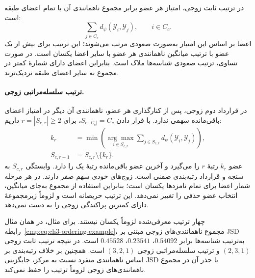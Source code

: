 در ترتیب ثابت زوجی، امتیاز هر عضو برابر مجموع
ناهمانندی آن با تمام اعضای طبقه است:
\begin{equation}\label{cmp:eq:ch3-pairwise-fixed-order}
\sum_{j\in C_c}d_\psi(\mathscr Y_i,\mathscr Y_j),
\qquad i\in C_c.
\end{equation}
اعضا بر اساس این امتیاز به‌صورت صعودی مرتب
می‌شوند؛ این ترتیب برای بیش از یک عضو با ترتیب
میانگین ناهمانندی هر عضو با سایر اعضا یکسان است.
در صورت تساوی، ترتیب صعودی شناسه‌ها ملاک است. بنابراین اعضای دارای شمارهٔ کمتر
در مجموع به سایر اعضای طبقه نزدیک‌ترند.

\paragraph{ترتیب سلسله‌مراتبی زوجی.}
در قرارداد دوم زوجی، پس از کنارگذاری هر عضو،
ناهمانندی آن دیگر در امتیاز اعضای باقی‌مانده
سهمی ندارد. با قرار دادن $S_{c,|C_c|}=C_c$،
برای $r=|S_{c,r}|\ge2$ داریم:
\begin{equation}\label{cmp:eq:ch3-pairwise-recursive-order}
\begin{aligned}
k_r&=\min\left(\underset{i\in S_{c,r}}{\arg\max}
\sum_{j\in S_{c,r}}d_\psi(\mathscr Y_i,\mathscr Y_j)\right),\\
S_{c,r-1}&=S_{c,r}\setminus\{k_r\}.
\end{aligned}
\end{equation}
عضو $k_r$ رتبهٔ $r$ را می‌گیرد و آخرین عضو
باقی‌مانده رتبهٔ یک را دارد. وابستگی $S_{c,r}$
به سنجه و قرارداد رتبه‌بندی ضمنی است. زوج‌های
خودی سهم صفر دارند. در هر مرحله شمار اعضا برای تمام
نامزدها یکسان است؛ بنابراین استفاده از مجموع
به‌جای میانگین، انتخاب عضو حذفی را تغییر نمی‌دهد.
این ترتیب حریصانه است و لزوماً زیرمجموعهٔ دارای
کمترین پراکندگی زوجی را به دست نمی‌دهد.

چهار ترتیب معرفی‌شده لزوماً یکسان نیستند.
برای مثال، در همان مثال
رابطه~\eqref{cmp:eq:ch3-ordering-example}،
مجموع ناهمانندی‌های زوجی مبتنی بر JSD به‌ترتیب
شناسه‌ها برابر $0.54092$، $0.23541$، $0.45528$ است.
در نتیجه ترتیب ثابت زوجی $(2,3,1)$ و ترتیب
سلسله‌مراتبی زوجی $(3,2,1)$ است. همچنین بر خلاف
رتبه‌بندی بر اساس ناهمانندی منفرد نسبت به مرکز،
جایگزینی JSD با جذر آن در مجموع ناهمانندی‌های
زوجی لزوماً ترتیب را حفظ نمی‌کند.

